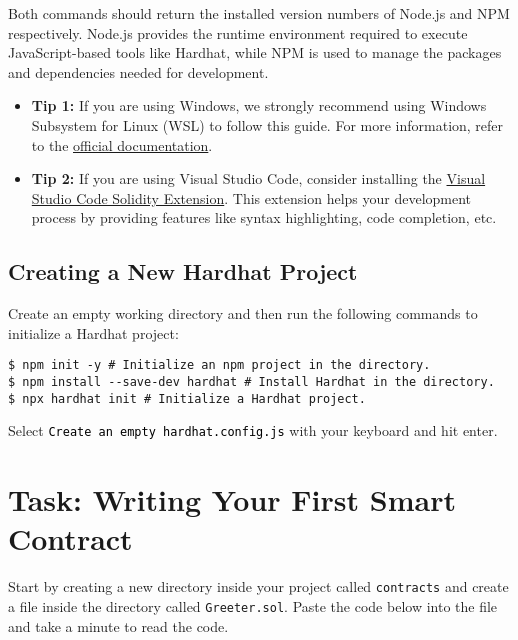 \documentclass[12pt]{article}
\newcommand{\codegrey}[1]{%
  \texttt{\colorbox{black!4}{\textcolor{black}{#1}}}%
}
\begin{document}
\noindent
Both commands should return the installed version numbers of Node.js and NPM respectively. Node.js provides the runtime environment required to execute JavaScript-based tools like Hardhat, while NPM is used to manage the packages and dependencies needed for development.

\begin{itemize}
    \item \textbf{Tip 1:} If you are using Windows, we strongly recommend using Windows Subsystem for Linux (WSL) to follow this guide. For more information, refer to the \href{https://learn.microsoft.com/en-us/windows/wsl/about}{official documentation}.
    
    \item \textbf{Tip 2:} If you are using Visual Studio Code, consider installing the \href{https://marketplace.visualstudio.com/items?itemName=JuanBlanco.solidity}{Visual Studio Code Solidity Extension}. This extension helps your development process by providing features like syntax highlighting, code completion, etc.
\end{itemize}

\subsection{Creating a New Hardhat Project}

Create an empty working directory and then run the following commands to initialize a Hardhat project:

\begin{verbatim}
$ npm init -y # Initialize an npm project in the directory.
$ npm install --save-dev hardhat # Install Hardhat in the directory.
$ npx hardhat init # Initialize a Hardhat project.
\end{verbatim}
Select \codegrey{Create an empty \texttt{hardhat.config.js}} with your keyboard and hit enter.

\section{Task: Writing Your First Smart Contract}

Start by creating a new directory inside your project called \texttt{contracts} and create a file inside the directory called \texttt{Greeter.sol}. Paste the code below into the file and take a minute to read the code.
\end{document}
